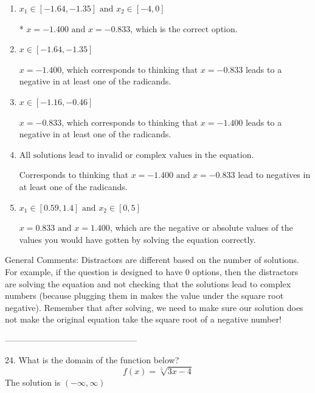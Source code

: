 \documentclass{article}[14pt]
\begin{document}
\begin{enumerate}[label=\Alph*.] 
\item $ x_1 \in [-1.64, -1.35] \text{ and } x_2 \in [-4,0] $ 

 * $x = -1.400 \text{ and } x = -0.833$, which is the correct option. 
\item $ x \in [-1.64,-1.35] $ 

 $x = -1.400$, which corresponds to thinking that $x = -0.833$ leads to a negative in at least one of the radicands. 
\item $ x \in [-1.16,-0.46] $ 

 $x = -0.833$, which corresponds to thinking that $x = -1.400$ leads to a negative in at least one of the radicands. 
\item $ \text{All solutions lead to invalid or complex values in the equation.} $ 

 Corresponds to thinking that $x = -1.400 \text{ and } x = -0.833$ lead to negatives in at least one of the radicands. 
\item $ x_1 \in [0.59, 1.4] \text{ and } x_2 \in [0,5] $ 

 $x = 0.833 \text{ and } x = 1.400$, which are the negative or absolute values of the values you would have gotten by solving the equation correctly. 
\end{enumerate} 
 
General Comments: Distractors are different based on the number of solutions. For example, if the question is designed to have 0 options, then the distractors are solving the equation and not checking that the solutions lead to complex numbers (because plugging them in makes the value under the square root negative). Remember that after solving, we need to make sure our solution does not make the original equation take the square root of a negative number!

-----------------------------------------------

24. What is the domain of the function below?
$$ f(x) = \sqrt[5]{3 x - 4} $$ 
The solution is $ (-\infty, \infty) $ 
\end{document}
